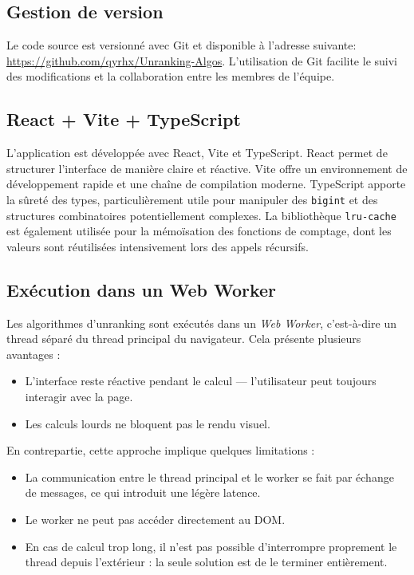 \documentclass[12pt, a4paper]{report}
\begin{document}
\subsection{Gestion de version}

Le code source est versionn\'e avec Git et disponible \`a l'adresse suivante:
\url{https://github.com/qyrhx/Unranking-Algos}. L'utilisation de Git facilite le suivi des modifications et
la collaboration entre les membres de l'\'equipe.

\subsection{React + Vite + TypeScript}

L'application est d\'evelopp\'ee avec React, Vite et TypeScript. React permet de
structurer l'interface de mani\`ere claire et r\'eactive. Vite offre un
environnement de d\'eveloppement rapide et une cha\^ine de compilation moderne.
TypeScript apporte la s\^uret\'e des types, particuli\`erement utile pour
manipuler des \texttt{bigint} et des structures combinatoires potentiellement
complexes. La biblioth\`eque \texttt{lru-cache} est \'egalement utilis\'ee pour la
m\'emo\"isation des fonctions de comptage, dont les valeurs sont r\'eutilis\'ees
intensivement lors des appels r\'ecursifs.

\subsection{Ex\'ecution dans un Web Worker}

Les algorithmes d'unranking sont ex\'ecut\'es dans un \textit{Web Worker}, c'est-\`a-dire
un thread s\'epar\'e du thread principal du navigateur. Cela pr\'esente plusieurs
avantages :

\begin{itemize}
  \item L'interface reste r\'eactive pendant le calcul — l'utilisateur peut
        toujours interagir avec la page.
  \item Les calculs lourds ne bloquent pas le rendu visuel.
\end{itemize}

En contrepartie, cette approche implique quelques limitations :

\begin{itemize}
  \item La communication entre le thread principal et le worker se fait par
        \'echange de messages, ce qui introduit une l\'eg\`ere latence.
  \item Le worker ne peut pas acc\'eder directement au DOM.
  \item En cas de calcul trop long, il n'est pas possible d'interrompre
        proprement le thread depuis l'ext\'erieur : la seule solution est de
        le terminer enti\`erement.
\end{itemize}
\end{document}
